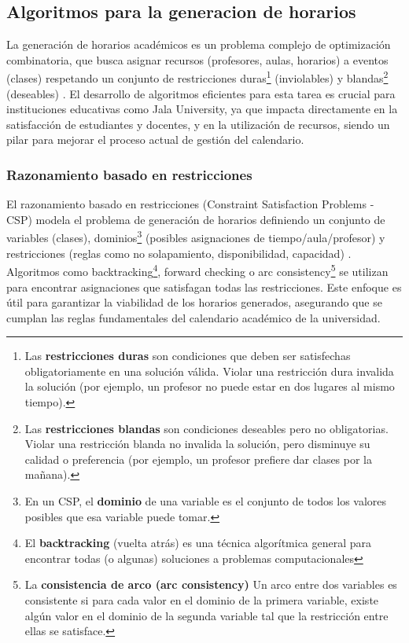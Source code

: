 \subsection{Algoritmos para la generacion de horarios}
La generación de horarios académicos es un problema complejo de optimización combinatoria, que busca asignar recursos (profesores, aulas, horarios) a eventos (clases) respetando un conjunto de restricciones duras\footnote{Las \textbf{restricciones duras} son condiciones que deben ser satisfechas obligatoriamente en una solución válida.
Violar una restricción dura invalida la solución (por ejemplo, un profesor no puede estar en dos lugares al mismo tiempo).} (inviolables) y blandas\footnote{Las \textbf{restricciones blandas} son condiciones deseables pero no obligatorias.
Violar una restricción blanda no invalida la solución, pero disminuye su calidad o preferencia (por ejemplo, un profesor prefiere dar clases por la mañana).} (deseables) \parencite{Schaerf1999}.
El desarrollo de algoritmos eficientes para esta tarea es crucial para instituciones educativas como Jala University, ya que impacta directamente en la satisfacción de estudiantes y docentes, y en la utilización de recursos, siendo un pilar para mejorar el proceso actual de gestión del calendario.

\subsubsection{Razonamiento basado en restricciones}
El razonamiento basado en restricciones (Constraint Satisfaction Problems - CSP) modela el problema de generación de horarios definiendo un conjunto de variables (clases), dominios\footnote{En un CSP, el \textbf{dominio} de una variable es el conjunto de todos los valores posibles que esa variable puede tomar.} (posibles asignaciones de tiempo/aula/profesor) y restricciones (reglas como no solapamiento, disponibilidad, capacidad) \parencite{Rossi2006}.
Algoritmos como backtracking\footnote{El \textbf{backtracking} (vuelta atrás) es una técnica algorítmica general para encontrar todas (o algunas) soluciones a problemas computacionales}, forward checking o arc consistency\footnote{La \textbf{consistencia de arco (arc consistency)} Un arco entre dos variables es consistente si para cada valor en el dominio de la primera variable, existe algún valor en el dominio de la segunda variable tal que la restricción entre ellas se satisface.} se utilizan para encontrar asignaciones que satisfagan todas las restricciones.
Este enfoque es útil para garantizar la viabilidad de los horarios generados, asegurando que se cumplan las reglas fundamentales del calendario académico de la universidad.

